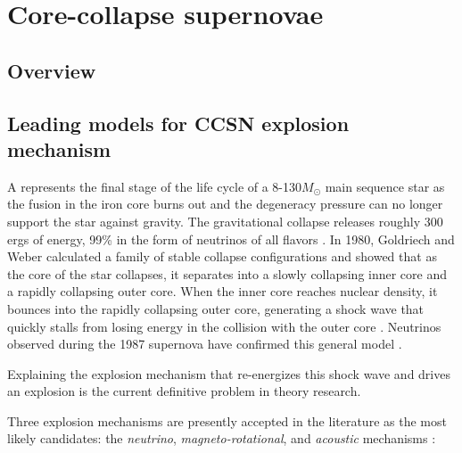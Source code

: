 \chapter{Core-collapse supernovae}

\section{Overview}
 
\section{Leading models for CCSN explosion mechanism}


A \sn{} represents the final stage of the life cycle of a 8-130$M_\odot$ main sequence star as the fusion in the iron core burns out and the degeneracy pressure can no longer support the star against gravity. The gravitational collapse releases roughly 300 ergs of energy, 99\% in the form of neutrinos of all flavors \cite{Louge}. In 1980, Goldriech and Weber calculated a family of stable collapse configurations and showed that as the core of the star collapses, it separates into a slowly collapsing inner core and a rapidly collapsing outer core. When the inner core reaches nuclear density, it bounces into the rapidly collapsing outer core, generating a shock wave that quickly stalls from losing energy in the collision with the outer core \cite{CoreCollapse}. Neutrinos observed during the 1987 supernova have confirmed this general model \cite{SNMECH}. 

Explaining the explosion mechanism that re-energizes this shock wave and drives an explosion is the current definitive problem in \sn{} theory research. 

Three \sn{} explosion mechanisms are presently accepted in the literature as the most likely candidates: the \textit{neutrino}, \textit{magneto-rotational}, and \textit{acoustic} mechanisms \cite{Ott-SN_GWs} : 

